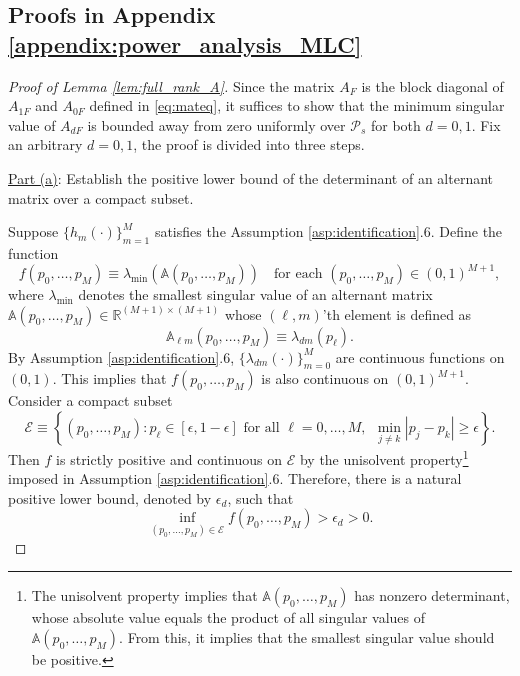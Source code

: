 \documentclass[11pt]{article}
\theoremstyle{definition}
\newcommand{\R}{\ensuremath{\mathbb{R}}}
\newcommand{\0}{\ensuremath{\mathbf{0}}}
\begin{document}
\begin{bibunit}
\subsection{Proofs in Appendix \ref{appendix:power_analysis_MLC}}

\begin{proof}[Proof of Lemma \ref{lem:full_rank_A}]
    Since the matrix $A_F$ is the block diagonal of $A_{1F}$ and $A_{0F}$ defined in \eqref{eq:mateq}, it suffices to show that the minimum singular value of $A_{dF}$ is bounded away from zero uniformly over $\mathcal{P}_s$ for both $d = 0,1$.  Fix an arbitrary $d = 0,1$, the proof is divided into three steps.

    \underline{Part (a)}: Establish the positive lower bound of the determinant of an alternant matrix over a compact subset. \par
    Suppose $\{h_m(\cdot)\}_{m=1}^M$ satisfies the Assumption \ref{asp:identification}.6. Define the function 
    \[
        f(p_0, \ldots, p_{M}) \equiv \lambda_{\min}(\mathbb{A}(p_0, \ldots, p_M)) \quad \text{for each }(p_0,\ldots, p_M) \in (0,1)^{M+1},
    \]
     where $\lambda_{\min}$ denotes the smallest singular value of an alternant matrix $\mathbb{A}(p_0, \ldots, p_M) \in \R^{(M+1) \times (M+1)}$ whose $(\ell,m)$'th element is defined as
    \[
        \mathbb{A}_{\ell m}(p_0, \ldots, p_M) \equiv \lambda_{dm}(p_\ell).
    \]
    By Assumption \ref{asp:identification}.6, $\{\lambda_{dm}(\cdot)\}_{m=0}^M$ are continuous functions on $(0,1)$. This implies that $f(p_0, \ldots, p_M)$ is also continuous on $(0,1)^{M+1}$. Consider a compact subset
    \begin{equation}
    \label{eq:compact_subset}
        \mathcal{E} \equiv \left\{(p_0,\ldots,p_M): p_\ell \in [\epsilon, 1-\epsilon] \text{ for all } \ell = 0,\ldots,M,~~ \min_{j \neq k}|p_j - p_k| \geq  \epsilon\right\}.
    \end{equation}
    Then $f$ is strictly positive and continuous on $\mathcal{E}$ by the unisolvent property\footnote{The unisolvent property implies that $\mathbb{A}(p_0,\ldots,p_M)$ has nonzero determinant, whose absolute value equals the product of all singular values of $\mathbb{A}(p_0,\ldots,p_M)$. From this, it implies that the smallest singular value should be positive.} imposed in Assumption \ref{asp:identification}.6. Therefore, there is a natural positive lower bound, denoted by $\epsilon_d$, such that
    \[
        \inf_{(p_0,\ldots, p_M) \in \mathcal{E}} f(p_0, \ldots, p_M) > \epsilon_d > 0.
    \]


\end{proof}
\end{bibunit}
\end{document}
